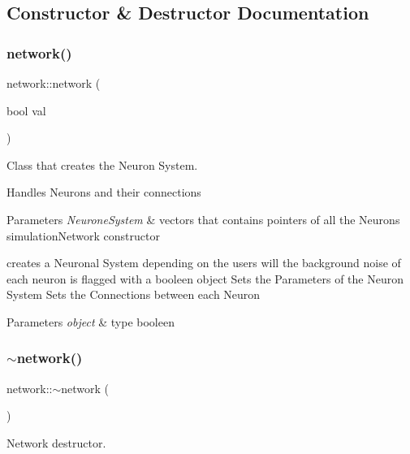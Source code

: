 \subsection{Constructor \& Destructor Documentation}
\mbox{\label{classnetwork_aac44f197a402ad67d1e7b266221bcca4}} 
\subsubsection{\texorpdfstring{network()}{network()}}
{\footnotesize\ttfamily network\+::network (\begin{DoxyParamCaption}\item[{bool}]{val }\end{DoxyParamCaption})}



Class that creates the Neuron System. 

Handles Neurons and their connections


\begin{DoxyParams}{Parameters}
{\em Neurone\+System} & vectors that contains pointers of all the Neurons simulation\+Network constructor\\
\hline
\end{DoxyParams}
creates a Neuronal System depending on the user\textquotesingle{}s will the background noise of each neuron is flagged with a booleen object Sets the Parameters of the Neuron System Sets the Connections between each Neuron 
\begin{DoxyParams}{Parameters}
{\em object} & type booleen \\
\hline
\end{DoxyParams}
\mbox{\label{classnetwork_a37b843338509d5a411b3efe2b702da15}} 
\subsubsection{\texorpdfstring{$\sim$network()}{~network()}}
{\footnotesize\ttfamily network\+::$\sim$network (\begin{DoxyParamCaption}{ }\end{DoxyParamCaption})}



Network destructor. 

